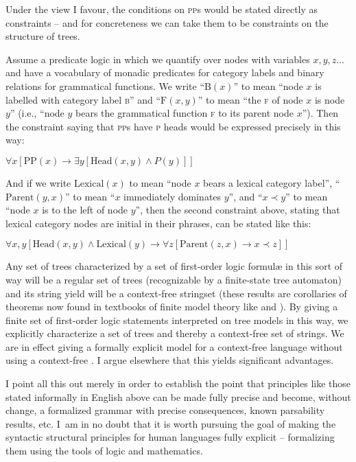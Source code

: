 \documentclass[output=paper]{langscibook}
\begin{document}
Under the view I favour, the conditions on \textsc{pp}s would be stated directly as constraints -- and for concreteness we can take them to be constraints on the structure of trees.

Assume a predicate logic in which we quantify over nodes with variables $x, y, z\ldots$ and have a vocabulary of monadic predicates for category labels and binary relations for grammatical functions.  We write ``$\text{B}(x)$'' to mean ``node $x$ is labelled with category label \textsc{b}'' and ``$\text{F}(x,y)$'' to mean ``the \textsc{f} of node $x$ is node $y$'' (i.e., ``node $y$ bears the grammatical function \textsc{f} to its parent node $x$''). Then the constraint saying that \textsc{pp}s have \textsc{p} heads would be expressed precisely in this way:

\ea $\forall x [ \text{PP}(x) \rightarrow                \exists y [ \text{Head}(x,y) \wedge P(y) ] ]$ 
\z

And if we write $\text{Lexical}(x)$ to mean ``node $x$ bears a lexical category label'', ``$\text{Parent}(y,x)$'' to mean ``$x$ immediately dominates $y$'', and ``$x \prec y$'' to mean ``node $x$ is to the left of node $y$'', then the second constraint above, stating that lexical category nodes are initial in their phrases, can be stated like this:

\ea $\forall x, y [ \text{Head}(x,y) \wedge \text{Lexical}(y) \rightarrow \forall z [ \text{Parent}(z,x) \rightarrow x \prec z ] ]$ 
\z

Any set of trees characterized by a set of first-order logic formul{\ae} in this sort of way will be a regular set of trees (recognizable by a finite-state tree automaton) and its string yield will be a context-free stringset (these results are corollaries of theorems now found in textbooks of finite model theory like \citealt{EbbiFlum99} and \citealt{Libkin04}). By giving a finite set of first-order logic statements interpreted on tree models in this way, we explicitly characterize a set of trees and thereby a context-free set of strings.  We are in effect giving a formally explicit model for a context-free language without using a context-free .  I argue elsewhere \citep{Pullum13} that this yields significant advantages.

I point all this out merely in order to establish the point that  principles like those stated informally in English above can be made fully precise and become, without change, a formalized grammar with precise consequences, known parsability results, etc. I~am in no doubt that it is worth pursuing the goal of making the syntactic structural principles for human languages fully explicit -- formalizing them using the tools of logic and mathematics.
\end{document}
